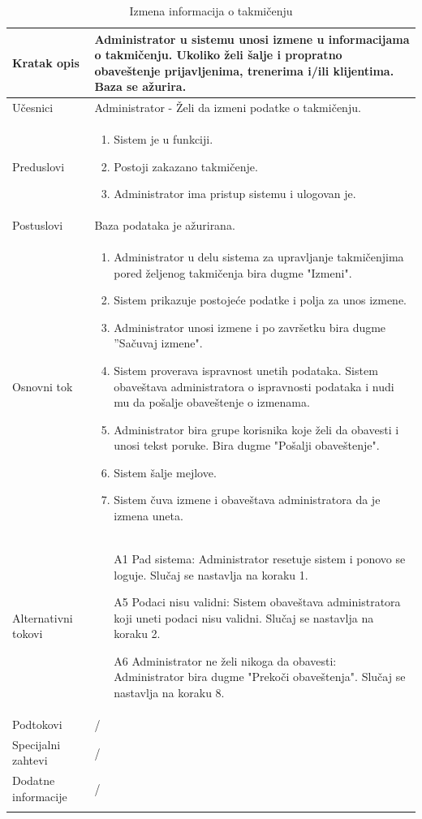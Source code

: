 \documentclass[../../main.tex]{subfiles}
\begin{document}
\begin{longtable}{| p{} | p{} |} 
\hline
    Kratak opis &  Administrator u sistemu unosi izmene u informacijama o takmičenju. Ukoliko želi šalje i propratno obaveštenje prijavljenima, trenerima i/ili klijentima. Baza se ažurira.\\ 
\hline    
    Učesnici & Administrator - Želi da izmeni podatke o takmičenju. \\
\hline
   Preduslovi & \begin{enumerate}
       \item Sistem je u funkciji.
       \item Postoji zakazano takmičenje.
       \item Administrator ima pristup sistemu i ulogovan je.
   \end{enumerate}\\
\hline  
    Postuslovi & Baza podataka je ažurirana.\\
\hline
    Osnovni tok & \begin{enumerate}
        \item Administrator u delu sistema za upravljanje takmičenjima pored željenog takmičenja bira dugme "Izmeni".
        \item Sistem prikazuje postojeće podatke i polja za unos izmene.
        \item Administrator unosi izmene i po završetku bira dugme ''Sačuvaj izmene".
        \item Sistem proverava ispravnost unetih podataka. Sistem obaveštava administratora o ispravnosti podataka i nudi mu da pošalje obaveštenje o izmenama.
        \item Administrator bira grupe korisnika koje želi da obavesti i unosi tekst poruke. Bira dugme "Pošalji obaveštenje".
        \item Sistem šalje mejlove. 
        \item Sistem čuva izmene i obaveštava administratora da je izmena uneta.
    \end{enumerate}\\
\hline
    Alternativni tokovi & \begin{itemize}
        \item[A1] Pad sistema: Administrator resetuje sistem i ponovo se loguje. Slučaj se nastavlja na koraku 1.
        \item[A5] Podaci nisu validni: Sistem obaveštava administratora koji uneti podaci nisu validni. Slučaj se nastavlja na koraku 2.
        \item[A6] Administrator ne želi nikoga da obavesti: Administrator bira dugme "Prekoči obaveštenja". Slučaj se nastavlja na koraku 8.
    \end{itemize}\\
\hline
    Podtokovi & /\\
\hline
    Specijalni zahtevi & /\\
\hline
    Dodatne informacije & /\\
\hline
\caption{Izmena informacija o takmičenju} %
\end{longtable}
\end{document}
